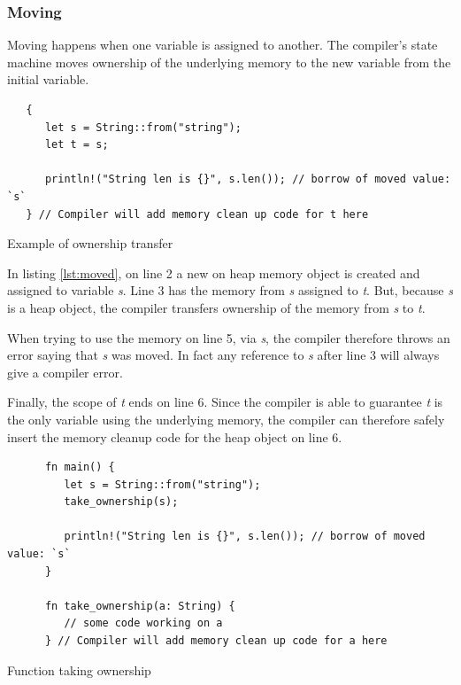 \documentclass[a4paper,10pt]{article}
\begin{document}
\subsubsection{Moving}
Moving happens when one variable is assigned to another. The compiler's state machine moves ownership of the underlying memory to the new variable from the initial variable.

\begin{listing}[ht]
   \begin{verbatim}
   {
      let s = String::from("string");
      let t = s;

      println!("String len is {}", s.len()); // borrow of moved value: `s`
   } // Compiler will add memory clean up code for t here
   \end{verbatim}
   \caption{Example of ownership transfer}
   \label{lst:moved}
\end{listing}

In listing \ref{lst:moved}, on line 2 a new on heap memory object is created and assigned to variable \textit{s}. Line 3 has the memory from \textit{s} assigned to \textit{t}. But, because \textit{s} is a heap object, the compiler transfers ownership of the memory from \textit{s} to \textit{t}.

When trying to use the memory on line 5, via \textit{s}, the compiler therefore throws an error saying that \textit{s} was moved. In fact any reference to \textit{s} after line 3 will always give a compiler error.

Finally, the scope of \textit{t} ends on line 6. Since the compiler is able to guarantee \textit{t} is the only variable using the underlying memory, the compiler can therefore safely insert the memory cleanup code for the heap object on line 6.

\begin{listing}[ht]
   \begin{verbatim}
      fn main() {
         let s = String::from("string");
         take_ownership(s);

         println!("String len is {}", s.len()); // borrow of moved value: `s`
      }

      fn take_ownership(a: String) {
         // some code working on a
      } // Compiler will add memory clean up code for a here
   \end{verbatim}

   \caption{Function taking ownership}
   \label{lst:fn-move}
\end{listing}
\end{document}

